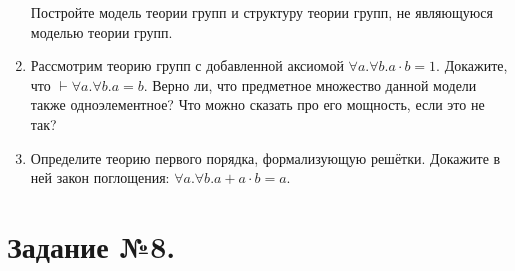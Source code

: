\documentclass[10pt,a4paper,oneside]{article}
\begin{document}
\begin{enumerate}
Постройте модель теории групп и структуру теории групп, не являющуюся моделью теории групп.

\item Рассмотрим теорию групп с добавленной аксиомой $\forall a.\forall b.a\cdot b = 1$. 
Докажите, что $\vdash \forall a.\forall b.a = b$. Верно ли, что предметное множество данной модели также одноэлементное?
Что можно сказать про его мощность, если это не так?

\item Определите теорию первого порядка, формализующую решётки. Докажите в ней закон поглощения: $\forall a.\forall b.a + a \cdot b = a$.

\end{enumerate}

\section*{Задание №8.}
\end{document}
